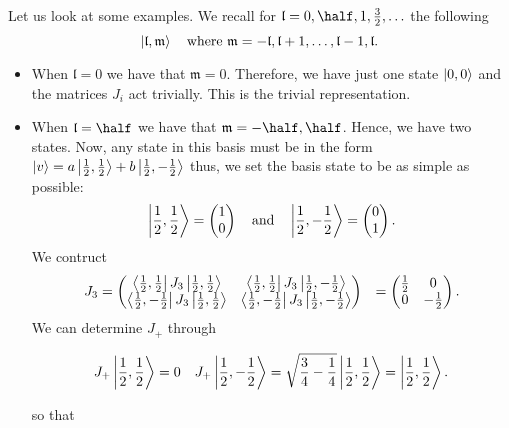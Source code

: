 \documentclass[12pt, a4paper]{article}
\begin{document}
\begin{example}
    Let us look at some examples. We recall for \(\mathfrak{l}=0,\half,1,\frac{3}{2},\ldots\) the following 
    \[\ket{\mathfrak{l},\mathfrak{m}} \quad \text{where } \mathfrak{m}=-\mathfrak{l},\mathfrak{l}+1,\ldots,\mathfrak{l}-1,\mathfrak{l}.\]
    \begin{itemize}
        \item When \( \mathfrak{l} = 0\) we have that \(\mathfrak{m}=0\). Therefore, we have just one state \( \ket{0,0} \) and the matrices \( J_i \) act trivially. This is the trivial representation.
        \item When \( \mathfrak{l} = \half\) we have that \(\mathfrak{m}=-\half,\half\). Hence, we have two states. Now, any state in this basis must be in the form \(\ket{v}=a\ket{\frac{1}{2}, \frac{1}{2}}+b\ket{\frac{1}{2}, -\frac{1}{2}}\) thus, we set the basis state to be as simple as possible:
        \[ \ket{\frac{1}{2}, \frac{1}{2}} = \begin{pmatrix} 1 \\ 0 \end{pmatrix} \quad \text{and} \quad \ket{\frac{1}{2}, -\frac{1}{2}} = \begin{pmatrix} 0 \\ 1 \end{pmatrix}.\]
        We contruct 
        \[\begin{aligned}
            J_3 &=\begin{pmatrix}
                \bra{\frac{1}{2}, \frac{1}{2}}J_3 \ket{\frac{1}{2}, \frac{1}{2}} & \bra{\frac{1}{2}, \frac{1}{2}} J_3 \ket{\frac{1}{2}, -\frac{1}{2}} \\
                \bra{\frac{1}{2}, -\frac{1}{2}}J_3 \ket{\frac{1}{2}, \frac{1}{2}} & \bra{\frac{1}{2}, -\frac{1}{2}} J_3 \ket{\frac{1}{2}, -\frac{1}{2}} \\
            \end{pmatrix}
            &=\begin{pmatrix} \frac{1}{2} & 0 \\ 0 & -\frac{1}{2} \end{pmatrix}.
        \end{aligned}\]
        We can determine \( J_+ \) through

\[ J_+\ket{\frac{1}{2}, \frac{1}{2}} = 0 \quad J_+\ket{\frac{1}{2}, -\frac{1}{2}} = \sqrt{\frac{3}{4} - \frac{1}{4}} \ket{\frac{1}{2}, \frac{1}{2}} = \ket{\frac{1}{2}, \frac{1}{2}}. \]

so that


\end{itemize}
\end{example}
\end{document}
